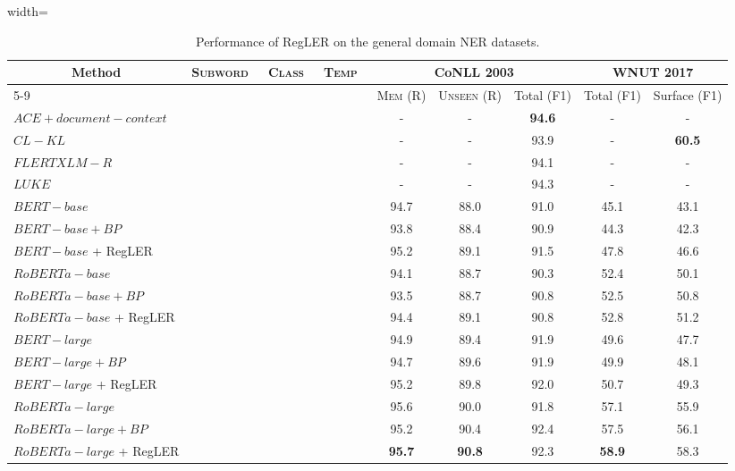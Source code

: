 \documentclass[11pt]{article}
\newcommand{\cmark}{\ding{51}}\newcommand{\xmark}{\ding{55}}\newcommand{\cross}{\ding{61}}\newcommand{\mb}[1]{\textcolor{red}{#1}}
\begin{document}
\begin{table*}[t]
\begin{adjustbox}{width=\textwidth}
\begin{tabular}{l c c c c c c | c c}
\toprule
 \multicolumn{1}{c}{\multirow{3}{*}{Method}} & \multicolumn{1}{c}{\multirow{3}{*}{\textsc{Subword}~}} &
\multicolumn{1}{c}{\multirow{3}{*}{\textsc{Class}~}} &
\multicolumn{1}{c}{\multirow{3}{*}{\textsc{Temp}~}} & \multicolumn{3}{c}{CoNLL 2003} & \multicolumn{2}{c}{WNUT 2017}      \\ \cmidrule{5-9} 
& & & & \textsc{Mem} (R) &  \textsc{Unseen} (R) &  Total (F1) & Total (F1) & Surface (F1) \\ \midrule
$ACE+document-context$ \cross & \xmark & \xmark & \xmark & - & - & \textbf{94.6} & - & - \\
$CL-KL$ \cross  & \xmark & \xmark & \xmark & - & - & 93.9 & - & \textbf{60.5} \\
$FLERT XLM-R$ \cross  & \xmark & \xmark & \xmark & - & - & 94.1 & - & - \\
$LUKE$ \cross & \xmark & \xmark & \xmark & - & - & 94.3 & - & - \\
\midrule
$BERT-base$ & \xmark & \xmark & \xmark & 94.7 & 88.0  & 91.0 & 45.1 & 43.1 \\
$BERT-base + {BP}$ & \xmark & \xmark & \xmark & 93.8 & 88.4  & 90.9 & 44.3 & 42.3 \\
$BERT-base$ + RegLER & \cmark & \cmark & \cmark & 95.2 & 89.1  & 91.5 & 47.8 & 46.6 \\
\midrule
$RoBERTa-base$ & \xmark & \xmark & \xmark & 94.1 & 88.7 & 90.3 & 52.4 & 50.1 \\
$RoBERTa-base + {BP}$ & \xmark & \xmark & \xmark & 93.5 & 88.7 & 90.8 & 52.5 & 50.8 \\
$RoBERTa-base$ + RegLER & \cmark & \cmark & \cmark & 94.4 & 89.1 & 90.8 & 52.8 & 51.2 \\
\midrule
$BERT-large$ & \xmark & \xmark & \xmark & 94.9 & 89.4 & 91.9 & 49.6 & 47.7 \\
$BERT-large + {BP}$ & \xmark & \xmark & \xmark & 94.7 & 89.6 & 91.9 & 49.9 & 48.1 \\
$BERT-large$ + RegLER & \cmark & \cmark & \cmark & 95.2 & 89.8 & 92.0 & 50.7 & 49.3 \\
\midrule
$RoBERTa-large$ & \xmark & \xmark & \xmark & 95.6 & 90.0 & 91.8 & 57.1 & 55.9 \\
$RoBERTa-large + {BP}$ & \xmark & \xmark & \xmark & 95.2 & 90.4 & 92.4 & 57.5 & 56.1 \\
$RoBERTa-large$ + RegLER & \cmark & \cmark & \cmark & \textbf{95.7} & \textbf{90.8} & 92.3 & \textbf{58.9} & 58.3 \\
\bottomrule
\end{tabular}
\end{adjustbox}
\caption{Performance of RegLER on the general domain NER datasets.}
\label{tab:maintable 2}
\end{table*}
\end{document}

